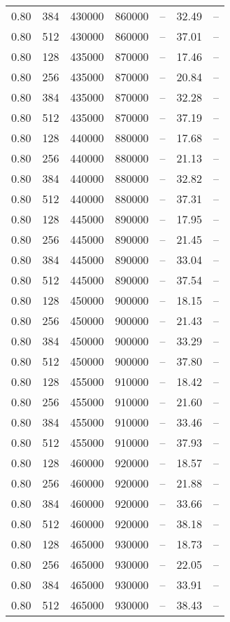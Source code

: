 \begin{tabular}{l|l|l|l|l|l|l}
0.80 & 384 & 430000 & 860000 & -- & 32.49 & --\\
0.80 & 512 & 430000 & 860000 & -- & 37.01 & --\\
0.80 & 128 & 435000 & 870000 & -- & 17.46 & --\\
0.80 & 256 & 435000 & 870000 & -- & 20.84 & --\\
0.80 & 384 & 435000 & 870000 & -- & 32.28 & --\\
0.80 & 512 & 435000 & 870000 & -- & 37.19 & --\\
0.80 & 128 & 440000 & 880000 & -- & 17.68 & --\\
0.80 & 256 & 440000 & 880000 & -- & 21.13 & --\\
0.80 & 384 & 440000 & 880000 & -- & 32.82 & --\\
0.80 & 512 & 440000 & 880000 & -- & 37.31 & --\\
0.80 & 128 & 445000 & 890000 & -- & 17.95 & --\\
0.80 & 256 & 445000 & 890000 & -- & 21.45 & --\\
0.80 & 384 & 445000 & 890000 & -- & 33.04 & --\\
0.80 & 512 & 445000 & 890000 & -- & 37.54 & --\\
0.80 & 128 & 450000 & 900000 & -- & 18.15 & --\\
0.80 & 256 & 450000 & 900000 & -- & 21.43 & --\\
0.80 & 384 & 450000 & 900000 & -- & 33.29 & --\\
0.80 & 512 & 450000 & 900000 & -- & 37.80 & --\\
0.80 & 128 & 455000 & 910000 & -- & 18.42 & --\\
0.80 & 256 & 455000 & 910000 & -- & 21.60 & --\\
0.80 & 384 & 455000 & 910000 & -- & 33.46 & --\\
0.80 & 512 & 455000 & 910000 & -- & 37.93 & --\\
0.80 & 128 & 460000 & 920000 & -- & 18.57 & --\\
0.80 & 256 & 460000 & 920000 & -- & 21.88 & --\\
0.80 & 384 & 460000 & 920000 & -- & 33.66 & --\\
0.80 & 512 & 460000 & 920000 & -- & 38.18 & --\\
0.80 & 128 & 465000 & 930000 & -- & 18.73 & --\\
0.80 & 256 & 465000 & 930000 & -- & 22.05 & --\\
0.80 & 384 & 465000 & 930000 & -- & 33.91 & --\\
0.80 & 512 & 465000 & 930000 & -- & 38.43 & --\\

\end{tabular}
